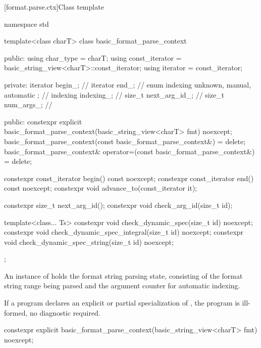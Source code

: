 [format.parse.ctx]{Class template }

%
%
%
%
\begin{codeblock}
namespace std {
  template<class charT>
  class basic_format_parse_context {
  public:
    using char_type = charT;
    using const_iterator = basic_string_view<charT>::const_iterator;
    using iterator = const_iterator;

  private:
    iterator begin_;                                    // \expos
    iterator end_;                                      // \expos
    enum indexing { unknown, manual, automatic };       // \expos
    indexing indexing_;                                 // \expos
    size_t next_arg_id_;                                // \expos
    size_t num_args_;                                   // \expos

  public:
    constexpr explicit basic_format_parse_context(basic_string_view<charT> fmt) noexcept;
    basic_format_parse_context(const basic_format_parse_context&) = delete;
    basic_format_parse_context& operator=(const basic_format_parse_context&) = delete;

    constexpr const_iterator begin() const noexcept;
    constexpr const_iterator end() const noexcept;
    constexpr void advance_to(const_iterator it);

    constexpr size_t next_arg_id();
    constexpr void check_arg_id(size_t id);

    template<class... Ts>
      constexpr void check_dynamic_spec(size_t id) noexcept;
    constexpr void check_dynamic_spec_integral(size_t id) noexcept;
    constexpr void check_dynamic_spec_string(size_t id) noexcept;
  };
}
\end{codeblock}

\pnum
An instance of  holds
the format string parsing state, consisting of
the format string range being parsed and
the argument counter for automatic indexing.

\pnum
If a program declares an explicit or partial specialization of
,
the program is ill-formed, no diagnostic required.

%
\begin{itemdecl}
constexpr explicit basic_format_parse_context(basic_string_view<charT> fmt) noexcept;
\end{itemdecl}

